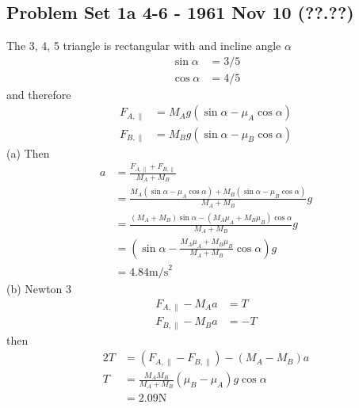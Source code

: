 \documentclass[../main.tex]{subfiles}
\begin{document}
\subsection{Problem Set 1a 4-6 - 1961 Nov 10 (??.??)}
The 3, 4, 5 triangle is rectangular with and incline angle $\alpha$
\begin{align}
\sin\alpha&=3/5\\
\cos\alpha&=4/5
\end{align}
and therefore
\begin{align}
F_{A,\parallel}&=M_Ag(\sin\alpha-\mu_A\cos\alpha)\\
F_{B,\parallel}&=M_Bg(\sin\alpha-\mu_B\cos\alpha)
\end{align}
(a) Then
\begin{align}
a
&=\frac{F_{A,\parallel}+F_{B,\parallel}}{M_A+M_B}\\
&=\frac{M_A(\sin\alpha-\mu_A\cos\alpha)+M_B(\sin\alpha-\mu_B\cos\alpha)}{M_A+M_B}g\\
&=\frac{(M_A+M_B)\sin\alpha-(M_A\mu_A+M_B\mu_B)\cos\alpha}{M_A+M_B}g\\
&=\left(\sin\alpha-\frac{M_A\mu_A+M_B\mu_B}{M_A+M_B}\cos\alpha\right)g\\
&=4.84\text{m/s}^2
\end{align}
(b) Newton 3
\begin{align}
F_{A,\parallel}-M_Aa&=T\\
F_{B,\parallel}-M_Ba&=-T
\end{align}
then
\begin{align}
2T
&=(F_{A,\parallel}-F_{B,\parallel})-(M_A-M_B)a\\
T&=\frac{M_AM_B}{M_A+M_B}(\mu_B-\mu_A)g\cos\alpha\\
&=2.09\text{N}
\end{align}
\end{document}
